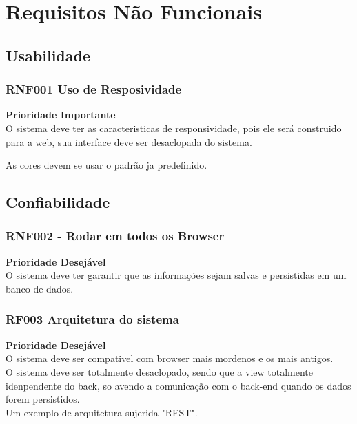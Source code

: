 \section{Requisitos Não Funcionais}
\hspace{2.0cm}

\subsection{Usabilidade}

\subsubsection{\textbf{RNF001 Uso de Resposividade}}

    \textbf{Prioridade Importante}  \\

    O sistema deve ter as caracteristicas de responsividade, pois ele será construido 
    para a web, sua interface deve ser desaclopada do sistema. 

    As cores devem se usar o padrão ja predefinido. 


\subsection{\textbf{Confiabilidade}}    

\subsubsection{\textbf{RNF002 - Rodar em todos os Browser}}

    \textbf{Prioridade Desejável} \\

    O sistema deve ter garantir que as informações sejam salvas e persistidas em 
    um banco de dados. 



\subsubsection{\textbf{RF003 Arquitetura do sistema}}

    \textbf{Prioridade Desejável}\\

    O sistema deve ser compativel com browser mais mordenos e os mais antigos. 
    \\
    O sistema deve ser totalmente desaclopado, sendo que a view totalmente 
    idenpendente do back, so avendo a comunicação com o back-end quando os 
    dados forem persistidos.
    \\
    Um exemplo de arquitetura sujerida "REST".
    

